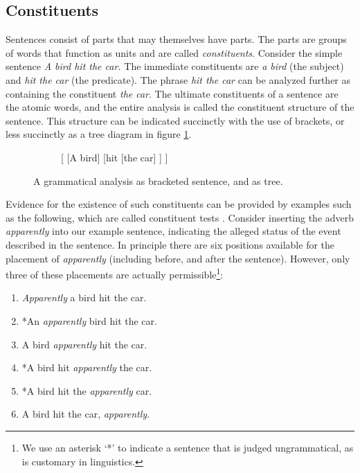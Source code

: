 \subsection{Constituents} Sentences consist of parts that may themselves have parts. The parts are groups of words that function as units and are called \textit{constituents}. Consider the simple sentence \textit{A bird hit the car.} The immediate constituents are \textit{a bird} (the subject) and \textit{hit the car} (the predicate). The phrase \textit{hit the car} can be analyzed further as containing the constituent \textit{the car}. The ultimate constituents of a sentence are the atomic words, and the entire analysis is called the constituent structure of the sentence. This structure can be indicated succinctly with the use of brackets, or less succinctly as a tree diagram in figure \ref{fig:bird-tree}.
\begin{figure}[h]{\textwidth}
  \center
  \begin{subfigure}[b]{0.4\textwidth}
    [ [A bird] [hit [the car] ] ]
  \end{subfigure}
  \begin{subfigure}[b]{0.4\textwidth}
  \end{subfigure}
  \caption{A grammatical analysis as bracketed sentence, and as tree.}
  \label{fig:bird-tree}
\end{figure}
Evidence for the existence of such constituents can be provided by examples such as the following, which are called constituent tests \citep{carnie2010constituent}. Consider inserting the adverb \textit{apparently} into our example sentence, indicating the alleged status of the event described in the sentence. In principle there are six positions available for the placement of \textit{apparently} (including before, and after the sentence). However, only three of these placements are actually permissible\footnote{We use an asterisk `*' to indicate a sentence that is judged ungrammatical, as is customary in linguistics.}:
\begin{enumerate}[noitemsep]
  \item \textit{Apparently} a bird hit the car.
  \item *An \textit{apparently} bird hit the car.
  \item A bird \textit{apparently} hit the car.
  \item *A bird hit \textit{apparently} the car.
  \item *A bird hit the \textit{apparently} car.
  \item A bird hit the car, \textit{apparently}.
\end{enumerate}
